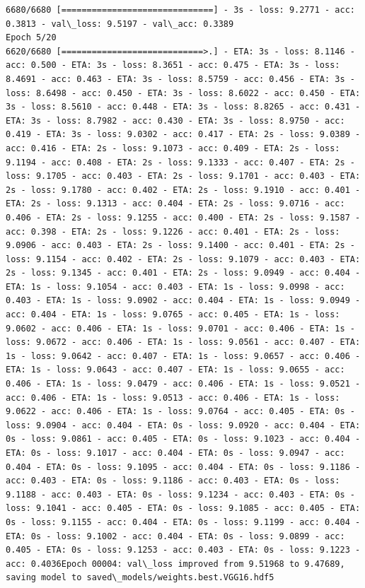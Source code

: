 \documentclass[11pt]{article}
\begin{document}
\begin{Verbatim}[commandchars=\\\{\}]
6680/6680 [==============================] - 3s - loss: 9.2771 - acc: 0.3813 - val\_loss: 9.5197 - val\_acc: 0.3389
Epoch 5/20
6620/6680 [============================>.] - ETA: 3s - loss: 8.1146 - acc: 0.500 - ETA: 3s - loss: 8.3651 - acc: 0.475 - ETA: 3s - loss: 8.4691 - acc: 0.463 - ETA: 3s - loss: 8.5759 - acc: 0.456 - ETA: 3s - loss: 8.6498 - acc: 0.450 - ETA: 3s - loss: 8.6022 - acc: 0.450 - ETA: 3s - loss: 8.5610 - acc: 0.448 - ETA: 3s - loss: 8.8265 - acc: 0.431 - ETA: 3s - loss: 8.7982 - acc: 0.430 - ETA: 3s - loss: 8.9750 - acc: 0.419 - ETA: 3s - loss: 9.0302 - acc: 0.417 - ETA: 2s - loss: 9.0389 - acc: 0.416 - ETA: 2s - loss: 9.1073 - acc: 0.409 - ETA: 2s - loss: 9.1194 - acc: 0.408 - ETA: 2s - loss: 9.1333 - acc: 0.407 - ETA: 2s - loss: 9.1705 - acc: 0.403 - ETA: 2s - loss: 9.1701 - acc: 0.403 - ETA: 2s - loss: 9.1780 - acc: 0.402 - ETA: 2s - loss: 9.1910 - acc: 0.401 - ETA: 2s - loss: 9.1313 - acc: 0.404 - ETA: 2s - loss: 9.0716 - acc: 0.406 - ETA: 2s - loss: 9.1255 - acc: 0.400 - ETA: 2s - loss: 9.1587 - acc: 0.398 - ETA: 2s - loss: 9.1226 - acc: 0.401 - ETA: 2s - loss: 9.0906 - acc: 0.403 - ETA: 2s - loss: 9.1400 - acc: 0.401 - ETA: 2s - loss: 9.1154 - acc: 0.402 - ETA: 2s - loss: 9.1079 - acc: 0.403 - ETA: 2s - loss: 9.1345 - acc: 0.401 - ETA: 2s - loss: 9.0949 - acc: 0.404 - ETA: 1s - loss: 9.1054 - acc: 0.403 - ETA: 1s - loss: 9.0998 - acc: 0.403 - ETA: 1s - loss: 9.0902 - acc: 0.404 - ETA: 1s - loss: 9.0949 - acc: 0.404 - ETA: 1s - loss: 9.0765 - acc: 0.405 - ETA: 1s - loss: 9.0602 - acc: 0.406 - ETA: 1s - loss: 9.0701 - acc: 0.406 - ETA: 1s - loss: 9.0672 - acc: 0.406 - ETA: 1s - loss: 9.0561 - acc: 0.407 - ETA: 1s - loss: 9.0642 - acc: 0.407 - ETA: 1s - loss: 9.0657 - acc: 0.406 - ETA: 1s - loss: 9.0643 - acc: 0.407 - ETA: 1s - loss: 9.0655 - acc: 0.406 - ETA: 1s - loss: 9.0479 - acc: 0.406 - ETA: 1s - loss: 9.0521 - acc: 0.406 - ETA: 1s - loss: 9.0513 - acc: 0.406 - ETA: 1s - loss: 9.0622 - acc: 0.406 - ETA: 1s - loss: 9.0764 - acc: 0.405 - ETA: 0s - loss: 9.0904 - acc: 0.404 - ETA: 0s - loss: 9.0920 - acc: 0.404 - ETA: 0s - loss: 9.0861 - acc: 0.405 - ETA: 0s - loss: 9.1023 - acc: 0.404 - ETA: 0s - loss: 9.1017 - acc: 0.404 - ETA: 0s - loss: 9.0947 - acc: 0.404 - ETA: 0s - loss: 9.1095 - acc: 0.404 - ETA: 0s - loss: 9.1186 - acc: 0.403 - ETA: 0s - loss: 9.1186 - acc: 0.403 - ETA: 0s - loss: 9.1188 - acc: 0.403 - ETA: 0s - loss: 9.1234 - acc: 0.403 - ETA: 0s - loss: 9.1041 - acc: 0.405 - ETA: 0s - loss: 9.1085 - acc: 0.405 - ETA: 0s - loss: 9.1155 - acc: 0.404 - ETA: 0s - loss: 9.1199 - acc: 0.404 - ETA: 0s - loss: 9.1002 - acc: 0.404 - ETA: 0s - loss: 9.0899 - acc: 0.405 - ETA: 0s - loss: 9.1253 - acc: 0.403 - ETA: 0s - loss: 9.1223 - acc: 0.4036Epoch 00004: val\_loss improved from 9.51968 to 9.47689, saving model to saved\_models/weights.best.VGG16.hdf5

\end{Verbatim}
\end{document}
